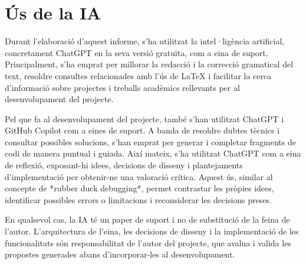 
\section*{Ús de la IA}

Durant l'elaboració d'aquest informe, s'ha utilitzat la intel·ligència artificial, concretament ChatGPT en la seva versió gratuïta, com a eina de suport. Principalment, s'ha emprat per millorar la redacció i la correcció gramatical del text, resoldre consultes relacionades amb l'ús de \LaTeX{} i facilitar la cerca d'informació sobre projectes i treballs acadèmics rellevants per al desenvolupament del projecte.

Pel que fa al desenvolupament del projecte, també s'han utilitzat ChatGPT i GitHub Copilot com a eines de suport. A banda de resoldre dubtes tècnics i consultar possibles solucions, s'han emprat per generar i completar fragments de codi de manera puntual i guiada. Així mateix, s'ha utilitzat ChatGPT com a eina de reflexió, exposant-hi idees, decisions de disseny i plantejaments d'implementació per obtenir-ne una valoració crítica. Aquest ús, similar al concepte de *rubber duck debugging*, permet contrastar les pròpies idees, identificar possibles errors o limitacions i reconsiderar les decisions preses.

En qualsevol cas, la IA té un paper de suport i no de substitució de la feina de l'autor. L'arquitectura de l'eina, les decisions de disseny i la implementació de les funcionalitats són responsabilitat de l'autor del projecte, que avalua i valida les propostes generades abans d'incorporar-les al desenvolupament.
